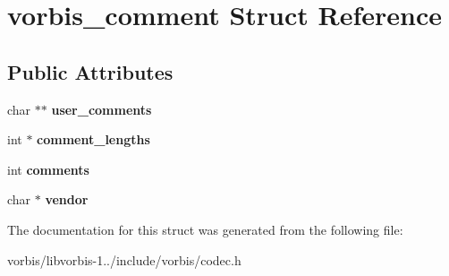 \hypertarget{structvorbis__comment}{\section{vorbis\+\_\+comment Struct Reference}
\label{structvorbis__comment}
}
\subsection*{Public Attributes}
\begin{DoxyCompactItemize}
\item 
\hypertarget{structvorbis__comment_ac45cb70542b0be5ce3e8d85db6df48ec}{char $\ast$$\ast$ {\bfseries user\+\_\+comments}}\label{structvorbis__comment_ac45cb70542b0be5ce3e8d85db6df48ec}

\item 
\hypertarget{structvorbis__comment_a4698d400a859e9338a5828ead97cacdf}{int $\ast$ {\bfseries comment\+\_\+lengths}}\label{structvorbis__comment_a4698d400a859e9338a5828ead97cacdf}

\item 
\hypertarget{structvorbis__comment_aa338208fb0f485b3818832a7d07dbe92}{int {\bfseries comments}}\label{structvorbis__comment_aa338208fb0f485b3818832a7d07dbe92}

\item 
\hypertarget{structvorbis__comment_a1f25158a2c045a6dd8a13b33b34612d3}{char $\ast$ {\bfseries vendor}}\label{structvorbis__comment_a1f25158a2c045a6dd8a13b33b34612d3}

\end{DoxyCompactItemize}


The documentation for this struct was generated from the following file\+:\begin{DoxyCompactItemize}
\item 
vorbis/libvorbis-\/1../include/vorbis/codec.\+h\end{DoxyCompactItemize}
